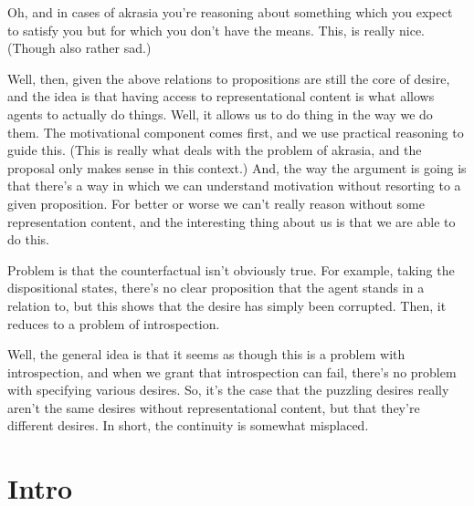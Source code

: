 \documentclass[10pt]{article}
\begin{document}
{\color{green}
  Oh, and in cases of akrasia you're reasoning about something which you expect to satisfy you but for which you don't have the means.
  This, is really nice.
  (Though also rather sad.)
}

{\color{blue}
  Well, then, given the above relations to propositions are still the core of desire, and the idea is that having access to representational content is what allows agents to actually do things.
  Well, it allows us to do thing in the way we do them.
  The motivational component comes first, and we use practical reasoning to guide this.
  (This is really what deals with the problem of akrasia, and the proposal only makes sense in this context.)
  And, the way the argument is going is that there's a way in which we can understand motivation without resorting to a given proposition.
  For better or worse we can't really reason without some representation content, and the interesting thing about us is that we are able to do this.
  
}




{\color{red} Problem is that the counterfactual isn't obviously true.
  For example, taking the dispositional states, there's no clear proposition that the agent stands in a relation to, but this shows that the desire has simply been corrupted.
  Then, it reduces to a problem of introspection.}

{\color{blue} Well, the general idea is that it seems as though this is a problem with introspection, and when we grant that introspection can fail, there's no problem with specifying various desires.
  So, it's the case that the puzzling desires really aren't the same desires without representational content, but that they're different desires.
  In short, the continuity is somewhat misplaced.}



\section{Intro}
\label{sec:intro}
\end{document}

